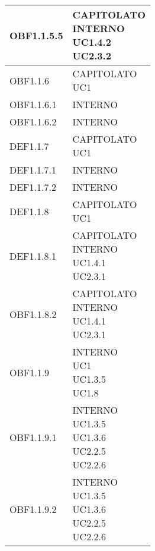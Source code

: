 \documentclass{scalatekids-article}
\begin{document}
\begin{longtable}[H]{|p{5.5cm}|p{5.5cm}|}
  \hline
  OBF1.1.5.5 & \multiLineCell[t]{CAPITOLATO\\INTERNO\\UC1.4.2\\UC2.3.2\\}\\
  \hline
  OBF1.1.6 & \multiLineCell[t]{CAPITOLATO\\UC1\\}\\
  \hline
  OBF1.1.6.1 & \multiLineCell[t]{INTERNO\\}\\
  \hline
  OBF1.1.6.2 & \multiLineCell[t]{INTERNO\\}\\
  \hline
  DEF1.1.7 & \multiLineCell[t]{CAPITOLATO\\UC1\\}\\
  \hline
  DEF1.1.7.1 & \multiLineCell[t]{INTERNO\\}\\
  \hline
  DEF1.1.7.2 & \multiLineCell[t]{INTERNO\\}\\
  \hline
  DEF1.1.8 & \multiLineCell[t]{CAPITOLATO\\UC1\\}\\
  \hline
  DEF1.1.8.1 & \multiLineCell[t]{CAPITOLATO\\INTERNO\\UC1.4.1\\UC2.3.1\\}\\
  \hline
  OBF1.1.8.2 & \multiLineCell[t]{CAPITOLATO\\INTERNO\\UC1.4.1\\UC2.3.1\\}\\
  \hline
  OBF1.1.9 & \multiLineCell[t]{INTERNO\\UC1\\UC1.3.5\\UC1.8\\}\\
  \hline
  OBF1.1.9.1 & \multiLineCell[t]{INTERNO\\UC1.3.5\\UC1.3.6\\UC2.2.5\\UC2.2.6\\}\\
  \hline
  OBF1.1.9.2 & \multiLineCell[t]{INTERNO\\UC1.3.5\\UC1.3.6\\UC2.2.5\\UC2.2.6\\}\\

\end{longtable}
\end{document}

